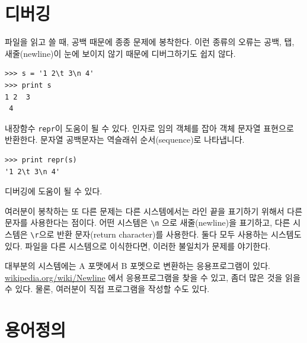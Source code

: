 \section{디버깅}


파일을 읽고 쓸 때, 공백 때문에 종종 문제에 봉착한다.
이런 종류의 오류는 공백, 탭, 새줄(newline)이 눈에 보이지 않기 때문에 디버그하기도 쉽지 않다.

\beforeverb
\begin{verbatim}
>>> s = '1 2\t 3\n 4'
>>> print s
1 2	 3
 4
\end{verbatim}
\afterverb


내장함수 {\tt repr}이 도움이 될 수 있다. 
인자로 임의 객체를 잡아 객체 문자열 표현으로 반환한다.
문자열 공백문자는 역슬래쉬 순서(sequence)로 나타냅니다.

\beforeverb
\begin{verbatim}
>>> print repr(s)
'1 2\t 3\n 4'
\end{verbatim}
\afterverb

디버깅에 도움이 될 수 있다.

여러분이 봉착하는 또 다른 문제는 다른 시스템에서는 라인 끝을 표기하기 위해서 다른 문자를 사용한다는 점이다.
어떤 시스템은 \verb"\n" 으로 새줄(newline)을 표기하고, 다른 시스템은 \verb"\r"으로 반환 문자(return character)를 사용한다.
둘다 모두 사용하는 시스템도 있다. 
파일을 다른 시스템으로 이식한다면, 이러한 불일치가 문제를 야기한다.


대부분의 시스템에는 A 포맷에서 B 포멧으로 변환하는 응용프로그램이 있다.
\url{wikipedia.org/wiki/Newline} 에서 응용프로그램을 찾을 수 있고, 좀더 많은 것을 읽을 수 있다.
물론, 여러분이 직접 프로그램을 작성할 수도 있다.


\section{용어정의}

